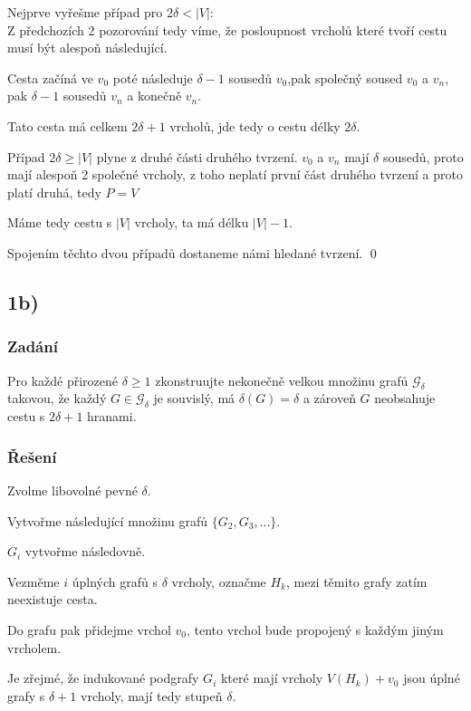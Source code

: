 \documentclass[../main.tex]{subfiles}
\begin{document}
Nejprve vyřešme případ pro $2\delta < |V|$:\\
Z předchozích 2 pozorování tedy víme, že posloupnost vrcholů které tvoří cestu musí být alespoň následující.

Cesta začíná ve $v_0$ poté následuje $\delta - 1$ sousedů $v_0$,pak společný soused $v_0$ a $v_n$,
pak $\delta - 1$ sousedů $v_n$ a konečně $v_n$.

Tato cesta má celkem $2\delta +1$ vrcholů, jde tedy o cestu délky $2\delta$.

Případ $2\delta \geq |V|$ plyne z druhé části druhého tvrzení. $v_0$ a $v_n$ mají $\delta$ sousedů, 
proto mají alespoň 2 společné vrcholy, z toho neplatí první část druhého tvrzení a proto platí druhá, tedy $P = V$

Máme tedy cestu s $|V|$ vrcholy, ta má délku $|V|-1$.

Spojením těchto dvou případů dostaneme námi hledané tvrzení. 
\qed



\subsection{1b)}
\subsubsection*{Zadání}
Pro každé přirozené $\delta\geq1$ zkonstruujte nekonečně velkou
množinu grafů $\mathcal{G}_\delta$ takovou, že každý $G\in\mathcal{G}_\delta$ je souvislý,
má $\delta(G) = \delta$ a zároveň $G$ neobsahuje cestu s $2\delta +1$ hranami.

\subsubsection*{Řešení}

Zvolme libovolné pevné $\delta$.

Vytvořme následující množinu grafů $\{ G_2, G_3, ... \}$.

$G_i$ vytvořme následovně. 

Vezměme $i$ úplných grafů s $\delta$ vrcholy, označme $H_k$, mezi těmito grafy zatím neexistuje cesta.

Do grafu pak přidejme vrchol $v_0$, tento vrchol bude propojený s každým jiným vrcholem.

Je zřejmé, že indukované podgrafy $G_i$ které mají vrcholy $V(H_k) + v_0$ jsou úplné grafy s $\delta +1$ vrcholy, mají tedy stupeň $\delta$.
\end{document}
